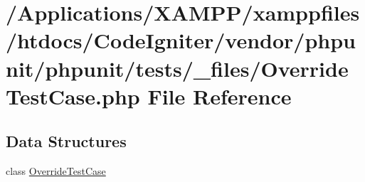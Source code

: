 \hypertarget{_override_test_case_8php}{}\section{/\+Applications/\+X\+A\+M\+P\+P/xamppfiles/htdocs/\+Code\+Igniter/vendor/phpunit/phpunit/tests/\+\_\+files/\+Override\+Test\+Case.php File Reference}
\label{_override_test_case_8php}
\subsection*{Data Structures}
\begin{DoxyCompactItemize}
\item 
class \mbox{\hyperlink{class_override_test_case}{Override\+Test\+Case}}
\end{DoxyCompactItemize}
